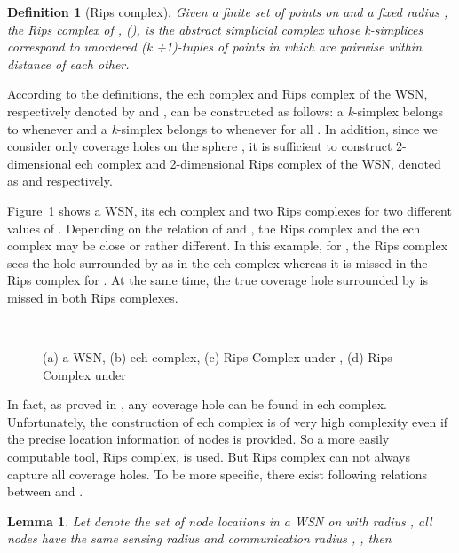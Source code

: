 \documentclass[journal, twoside]{IEEEtran}
\newtheorem{definition}{Definition}
\newtheorem{lemma}{Lemma}
\begin{document}
\begin{definition} [Rips complex]
Given a finite set of points  on 
 and a fixed radius , the Rips complex of ,
(), is the abstract simplicial complex
whose \textit{k}-simplices correspond to unordered \emph{(\textit{k} +1)}-tuples of 
points in  which are pairwise within distance  of each other.
\end{definition}

According to the definitions, the
ech complex and Rips complex of the WSN, respectively denoted by  and , can be
constructed as follows: a \textit{k}-simplex  belongs to  whenever  and a \textit{k}-simplex  belongs to
 whenever  for all
. In addition, since we consider only coverage holes on 
the sphere , it is sufficient to construct 
2-dimensional ech complex and 2-dimensional Rips complex of the WSN,
denoted as  and 
respectively.

Figure~\ref{example} shows a WSN, its ech complex and
two Rips complexes for two different values of . Depending on the
relation of  and , the Rips complex and the ech
complex may be close or rather different. In this example, for
, the Rips complex sees the hole surrounded by 
as in the ech complex whereas it is missed in the
Rips complex for . At the same time, the true coverage
hole surrounded by  is missed in both Rips complexes.

\begin{figure}[ht]
  \centering {}
  \hspace{4pt}
  \\
  \hspace{4pt}
  \caption{(a) a WSN, (b) ech complex, (c) Rips
    Complex under , (d) Rips Complex under }
  \label{example}
\end{figure}

In fact, as proved in \cite{BT82}, any coverage hole can be found in 
ech complex. Unfortunately, the construction of ech complex 
is of very high complexity even if the precise location information of nodes is provided. So a more easily computable tool, Rips complex, is used. But Rips complex can not always capture all coverage holes. To be more specific, there exist following
relations between  and 
.

\begin{lemma} \label{lemmaCR}
Let  denote the set of node locations in a WSN on 
 with radius , all nodes have the same sensing
radius  and communication radius , ,
then
 
\end{lemma}
\end{document}
